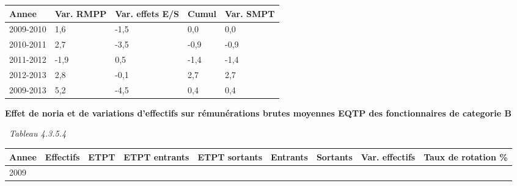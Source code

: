 \begin{longtable}[]{@{}lllll@{}}
\toprule
Annee & Var. RMPP & Var. effets E/S & Cumul & Var. SMPT\tabularnewline
\midrule
\endhead
2009-2010 & 1,6 & -1,5 & 0,0 & 0,0\tabularnewline
2010-2011 & 2,7 & -3,5 & -0,9 & -0,9\tabularnewline
2011-2012 & -1,9 & 0,5 & -1,4 & -1,4\tabularnewline
2012-2013 & 2,8 & -0,1 & 2,7 & 2,7\tabularnewline
2009-2013 & 5,2 & -4,5 & 0,4 & 0,4\tabularnewline
\bottomrule
\end{longtable}

\textbf{Effet de noria et de variations d'effectifs sur rémunérations
brutes moyennes EQTP des fonctionnaires de categorie B}

~\emph{Tableau 4.3.5.4}

\begin{longtable}[]{@{}lllllllll@{}}
\toprule
\begin{minipage}[b]{0.05\columnwidth}\raggedright
Annee\strut
\end{minipage} & \begin{minipage}[b]{0.08\columnwidth}\raggedright
Effectifs\strut
\end{minipage} & \begin{minipage}[b]{0.04\columnwidth}\raggedright
ETPT\strut
\end{minipage} & \begin{minipage}[b]{0.10\columnwidth}\raggedright
ETPT entrants\strut
\end{minipage} & \begin{minipage}[b]{0.10\columnwidth}\raggedright
ETPT sortants\strut
\end{minipage} & \begin{minipage}[b]{0.07\columnwidth}\raggedright
Entrants\strut
\end{minipage} & \begin{minipage}[b]{0.07\columnwidth}\raggedright
Sortants\strut
\end{minipage} & \begin{minipage}[b]{0.11\columnwidth}\raggedright
Var. effectifs\strut
\end{minipage} & \begin{minipage}[b]{0.14\columnwidth}\raggedright
Taux de rotation \%\strut
\end{minipage}\tabularnewline
\midrule
\endhead
\begin{minipage}[t]{0.05\columnwidth}\raggedright
2009\strut
\end{minipage} & \begin{minipage}[t]{0.08\columnwidth}\raggedright

\end{minipage}
\end{longtable}
